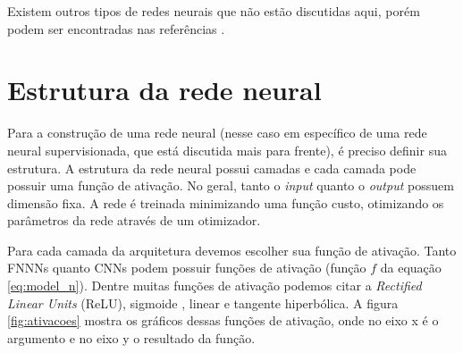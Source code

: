 \documentclass[a4paper,12pt,oneside]{book}
\begin{document}
\par Existem outros tipos de redes neurais que não estão discutidas aqui, porém podem ser encontradas nas referências \cite{rbfbook, RNN_fund}.

\section{Estrutura da rede neural}

\par Para a construção de uma rede neural (nesse caso em específico de uma rede neural supervisionada, que está discutida mais para frente), é preciso definir sua estrutura. A estrutura da rede neural possui camadas e cada camada pode possuir uma função de ativação. No geral, tanto o \textit{input} quanto o \textit{output} possuem dimensão fixa. A rede é treinada minimizando uma função custo, otimizando os parâmetros da rede através de um otimizador.


\par Para cada camada da arquitetura devemos escolher sua função de ativação. Tanto FNNNs quanto CNNs podem possuir funções de ativação (função $f$ da equação \ref{eq:model_n}). Dentre muitas funções de ativação podemos citar a \textit{Rectified Linear Units} (ReLU)\cite{RELU}, sigmoide \cite{sigmoid_act}, linear e tangente hiperbólica\cite{act_comp}. A figura \ref{fig:ativacoes} mostra os gráficos dessas funções de ativação, onde no eixo x é o argumento e no eixo y o resultado da função.
\end{document}
